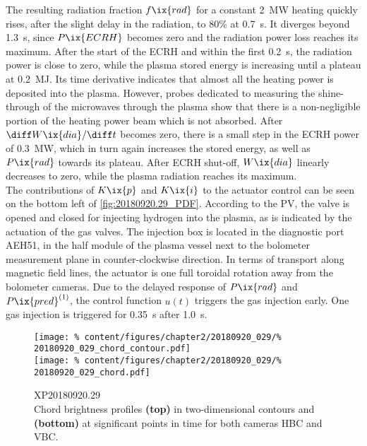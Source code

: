             The resulting radiation fraction $f\ix{rad}$ for a constant \SI{2}{\mega\watt} heating quickly rises, after the slight delay in the radiation, to $80\%$ at \SI{0.7}{\second}. It diverges beyond \SI{1.3}{\second}, since $P\ix{ECRH}$ becomes zero and the radiation power loss reaches its maximum. After the start of the ECRH and within the first \SI{0.2}{\second}, the radiation power is close to zero, while the plasma stored energy is increasing until a plateau at \SI{0.2}{\mega\joule}. Its time derivative indicates that almost all the heating power is deposited into the plasma. However, probes dedicated to measuring the shine-through of the microwaves through the plasma show that there is a non-negligible portion of the heating power beam which is not absorbed. After $\diff W\ix{dia}/\diff t$ becomes zero, there is a small step in the ECRH power of \SI{0.3}{\mega\watt}, which in turn again increases the stored energy, as well as $P\ix{rad}$ towards its plateau. After ECRH shut-off, $W\ix{dia}$ linearly decreases to zero, while the plasma radiation reaches its maximum.\\%
            The contributions of $K\ix{p}$ and $K\ix{i}$ to the actuator control can be seen on the bottom left of \cref{fig:20180920.29_PDF}. According to the PV, the valve is opened and closed for injecting hydrogen into the plasma, as is indicated by the actuation of the gas valves. The injection box is located in the diagnostic port AEH51, in the half module of the plasma vessel next to the bolometer measurement plane in counter-clockwise direction. In terms of transport along magnetic field lines, the actuator is one full toroidal rotation away from the bolometer cameras. Due to the delayed response of $P\ix{rad}$ and $P\ix{pred}^{\left(1\right)}$, the control function $u\left(t\right)$ triggers the gas injection early. One gas injection is triggered for \SI{0.35}{\second} after \SI{1.0}{\second}.\\%
%
            \begin{figure}[t]%
                \centering%
                \texttt{[image: \%
                    content/figures/chapter2/20180920\_029/\%
                    20180920\_029\_chord\_contour.pdf]}\\%
                \texttt{[image: \%
                    content/figures/chapter2/20180920\_029/\%
                    20180920\_029\_chord.pdf]}\\%
                \caption{%
                    XP20180920.29\\%
                    Chord brightness profiles \textbf{(top)} in two-dimensional contours and \textbf{(bottom)} at significant points in time for both cameras HBC and VBC.}\label{fig:20180920.29_CP}%
            \end{figure}%
